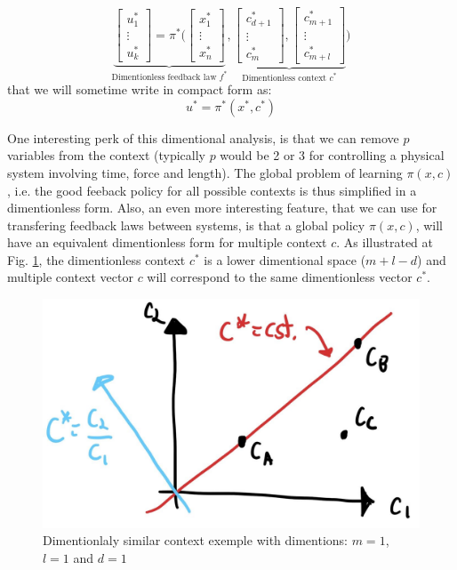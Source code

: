\begin{equation}
\underbrace{
\begin{bmatrix}
u_1^* \\
\vdots \\
u_k^*
\end{bmatrix}
=
\pi^* \Biggl(
\begin{bmatrix}
x_1^* \\
\vdots \\
x_n^*
\end{bmatrix}
}_{\text{Dimentionless feedback law $f^*$}}
,
\underbrace{
\begin{bmatrix}
c_{d+1}^* \\
\vdots \\
c_{m}^*
\end{bmatrix}
,
\begin{bmatrix}
c_{m+1}^* \\
\vdots \\
c_{m+l}^*
\end{bmatrix}
}_{\text{Dimentionless context $c^*$}}
\Biggr)
\label{eq:vectordimpolicy}
\end{equation}
that we will sometime write in compact form as: 
\begin{equation}
u^* = \pi^*( x^* , c^* )
\label{eq:vectordimpolicyshort}
\end{equation}

One interesting perk of this dimentional analysis, is that we can remove $p$ variables from the context (typically $p$ would be 2 or 3 for controlling a physical system involving time, force and length). The global problem of learning $\pi(x,c)$, i.e. the good feeback policy for all possible contexts is thus simplified in a dimentionless form. Also, an even more interesting feature, that we can use for transfering feedback laws between systems, is that a global policy $\pi( x , c )$, will have an equivalent dimentionless form for multiple context $c$. As illustrated at Fig. \ref{fig:c_space}, the dimentionless context $c^*$ is a lower dimentional space ($m+l-d$) and multiple context vector $c$ will correspond to the same dimentionless vector $c^*$. 
\begin{figure}[ht]
\vspace{-5pt}
\begin{center}
\includegraphics[width=0.60\linewidth]{fig/c_space.jpg}
\caption{Dimentionlaly similar context exemple with dimentions: $m=1$, $l=1$ and $d=1$}\label{fig:c_space}
\end{center}
\vspace{-15pt}
\end{figure}

